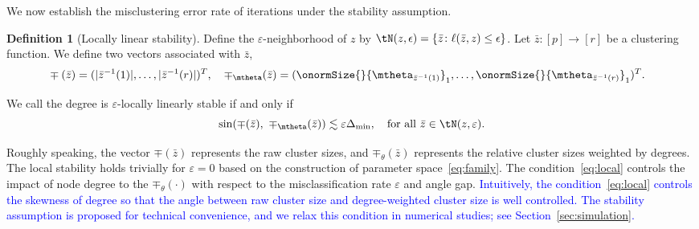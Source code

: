 \documentclass[lettersize,onecolumn,journal]{IEEEtran}
\theoremstyle{definition}
\theoremstyle{definition}
\newtheorem{defn}{Definition}
\begin{document}
We now establish the misclustering error rate of iterations under the stability assumption. 
\begin{defn}[Locally linear stability] \label{def:stable}
Define the $\varepsilon$-neighborhood of $z$ by $\tN(z,\epsilon)=\{\bar z\colon \ell(\bar z, z)\leq \epsilon\}$. Let $\bar z\colon[p]\to [r]$ be a clustering function. We define two vectors associated with $\bar z$,
\begin{align}
    &\mp(\bar z)=(|\bar z^{-1}(1)|, \ldots,|\bar z^{-1}(r)|)^T, \quad \mp_{\mtheta}(\bar z)=(\onormSize{}{\mtheta_{\bar z^{-1}(1)}}_1,\ldots,\onormSize{}{\mtheta_{\bar z^{-1}(r)}}_1)^T.
\end{align}

We call the degree is $\varepsilon$-locally linearly stable if and only if 
\begin{equation}\label{eq:local}
    \sin(\mp(\bar z),\ \mp_{\mtheta}(\bar z))\lesssim \varepsilon \Delta_{\min} ,\quad \text{for all } \bar z\in \tN(z, \varepsilon).
\end{equation}
\end{defn}

Roughly speaking, the vector $\mp(\bar z)$ represents the raw cluster sizes, and $\mp_{\theta}(\bar z)$ represents the relative cluster sizes weighted by degrees. 
The local stability holds trivially for $\varepsilon=0$ based on the construction of parameter space~\eqref{eq:family}. The condition~\eqref{eq:local} controls the impact of node degree to the $\mp_{\theta}(\cdot)$ with respect to the misclassification rate $\varepsilon$ and angle gap. \textcolor{blue}{Intuitively, the condition~\eqref{eq:local} controls the skewness of degree so that the angle between raw cluster size and degree-weighted cluster size is well controlled. The stability assumption is proposed for technical convenience, and we relax this condition in numerical studies; see Section~\ref{sec:simulation}.}
\end{document}
